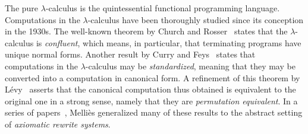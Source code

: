 The pure $\lambda$-calculus is the quintessential functional programming language.
Computations in the $\lambda$-calculus have been thoroughly
studied since its conception in the 1930s.
The well-known theorem by Church and Rosser~\cite{church1936some}
states that the $\lambda$-calculus is \emph{confluent},
which means, in particular, that terminating programs have unique normal forms.
Another result by Curry and Feys~\cite{curry1958combinatory}
states that computations in the
$\lambda$-calculus may be \emph{standardized},
meaning that they may be converted into a computation in canonical form.
A refinement of this theorem by L\'evy~\cite{Tesis:Levy:1978}
asserts that the canonical computation thus obtained is equivalent to the
original one in a strong sense, namely that they are \emph{permutation equivalent}.
In a series of papers~\cite{DBLP:conf/ctcs/Mellies97,DBLP:journals/logcom/Mellies00,DBLP:conf/rta/Mellies02,mellies2002axiomatic,DBLP:conf/birthday/Mellies05},
Melli\`es generalized many of these results to the abstract setting of {\em axiomatic rewrite systems}.

